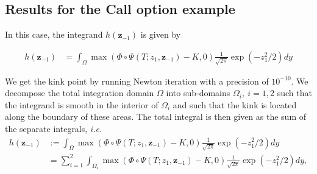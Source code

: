 \documentclass[11pt]{article}
\newcommand{\ie}{\emph{i.e.}}
\begin{document}


\FloatBarrier
\subsection{Results for the Call option example}\label{sec:Results for the call option example}


In this case, the integrand $h(\mathbf{z}_{-1})$ is given by

\begin{align}\label{smoothed_integrand_call_opt_2}
	h(\mathbf{z}_{-1})&= \int_{\Omega}  \max \left(\Phi \circ \Psi(T;z_1,\mathbf{z}_{-1})-K,0\right) \frac{1}{\sqrt{2 \pi}} \operatorname{exp}(-z_1^2/2) dy 
\end{align}


We get the kink point by running Newton iteration with a precision of $10^{-10}$. We  decompose the total integration domain $\Omega$  into sub-domains $\Omega_i,\: i=1,2$ such that the
integrand is smooth in the interior of 
$\Omega_i$ and such that the kink is located along the boundary of these areas. The total integral is then given
as the sum of the separate integrals, \ie
\begin{align}
	h(\mathbf{z}_{-1}) &:=  \int_{\Omega} \max \left(\Phi \circ \Psi(T;z_1,\mathbf{z}_{-1})-K,0\right) \frac{1}{\sqrt{2 \pi}} \operatorname{exp}(-z_1^2/2) dy \\ \nonumber
	&=\sum_{i=1}^{2}	\int_{\Omega_i} \max \left(\Phi \circ \Psi(T;z_1,\mathbf{z}_{-1})-K,0\right) \frac{1}{\sqrt{2 \pi}} \operatorname{exp}(-z_1^2/2) dy,
\end{align}
\end{document}
